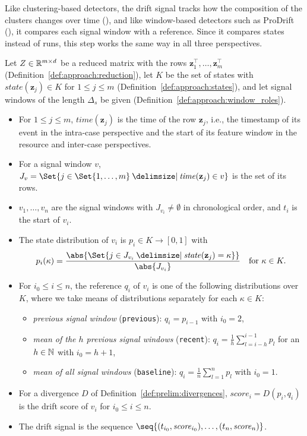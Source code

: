 Like clustering-based detectors, the drift signal tracks how the composition of the clusters changes over time (\textcite{sato2022survey}), and like window-based detectors such as ProDrift (\textcite{maaradji2017detecting}), it compares each signal window with a reference. Since it compares states instead of runs, this step works the same way in all three perspectives.

\begin{definition}
	\label{def:approach:drift_signal}
	Let $Z \in \mathbb R^{m \times d}$ be a reduced matrix with the rows $\mathbf{z}_1^\top, \dots, \mathbf{z}_m^\top$ (Definition~\ref{def:approach:reduction}), let $K$ be the set of states with $\mathit{state}(\mathbf{z}_j) \in K$ for $1 \le j \le m$ (Definition~\ref{def:approach:states}), and let signal windows of the length $\Delta_s$ be given (Definition~\ref{def:approach:window_roles}).
	\begin{itemize}
		\item For $1 \le j \le m$, $\mathit{time}(\mathbf{z}_j)$ is the time of the row $\mathbf{z}_j$, i.e., the timestamp of its event in the intra-case perspective and the start of its feature window in the resource and inter-case perspectives.
		\item For a signal window $v$, $J_v = \Set{j \in \Set{1, \dots, m} \given \mathit{time}(\mathbf{z}_j) \in v}$ is the set of its rows.
		\item $v_1, \dots, v_n$ are the signal windows with $J_{v_i} \neq \emptyset$ in chronological order, and $t_i$ is the start of $v_i$.
		\item The state distribution of $v_i$ is $p_i \in K \to [0, 1]$ with
		      \[
			      p_i(\kappa) = \frac{\abs{\Set{j \in J_{v_i} \given \mathit{state}(\mathbf{z}_j) = \kappa}}}{\abs{J_{v_i}}} \quad\text{for } \kappa \in K.
		      \]
		\item For $i_0 \le i \le n$, the reference $q_i$ of $v_i$ is one of the following distributions over $K$, where we take means of distributions separately for each $\kappa \in K$:
		      \begin{itemize}
			      \item \emph{previous signal window} (\texttt{previous}): $q_i = p_{i-1}$ with $i_0 = 2$,
			      \item \emph{mean of the $h$ previous signal windows} (\texttt{recent}): $q_i = \frac{1}{h} \sum_{l = i-h}^{i-1} p_l$ for an $h \in \mathbb N$ with $i_0 = h + 1$,
			      \item \emph{mean of all signal windows} (\texttt{baseline}): $q_i = \frac{1}{n} \sum_{l=1}^{n} p_l$ with $i_0 = 1$.
		      \end{itemize}
		\item For a divergence $D$ of Definition~\ref{def:prelim:divergences}, $\mathit{score}_i = D(p_i, q_i)$ is the drift score of $v_i$ for $i_0 \le i \le n$.
		\item The drift signal is the sequence $\seq{(t_{i_0}, \mathit{score}_{i_0}), \dots, (t_n, \mathit{score}_n)}$.
	\end{itemize}
\end{definition}

